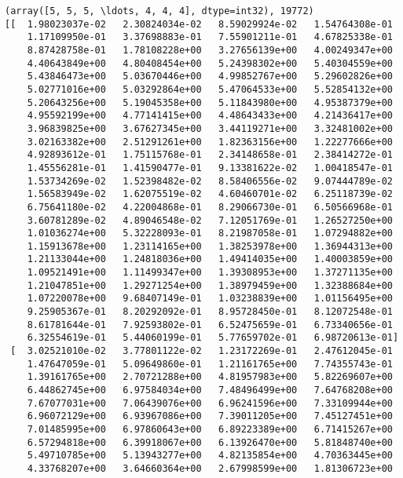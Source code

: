 \documentclass{article}
\begin{document}
    \begin{Verbatim}[commandchars=\\\{\}]
(array([5, 5, 5, \ldots, 4, 4, 4], dtype=int32), 19772)
[[  1.98023037e-02   2.30824034e-02   8.59029924e-02   1.54764308e-01
    1.17109950e-01   3.37698883e-01   7.55901211e-01   4.67825338e-01
    8.87428758e-01   1.78108228e+00   3.27656139e+00   4.00249347e+00
    4.40643849e+00   4.80408454e+00   5.24398302e+00   5.40304559e+00
    5.43846473e+00   5.03670446e+00   4.99852767e+00   5.29602826e+00
    5.02771016e+00   5.03292864e+00   5.47064533e+00   5.52854132e+00
    5.20643256e+00   5.19045358e+00   5.11843980e+00   4.95387379e+00
    4.95592199e+00   4.77141415e+00   4.48643433e+00   4.21436417e+00
    3.96839825e+00   3.67627345e+00   3.44119271e+00   3.32481002e+00
    3.02163382e+00   2.51291261e+00   1.82363156e+00   1.22277666e+00
    4.92893612e-01   1.75115768e-01   2.34148658e-01   2.38414272e-01
    1.45556281e-01   1.41590477e-01   9.13381622e-02   1.00418547e-01
    1.53734269e-02   1.52398482e-02   8.58406556e-02   9.07444789e-02
    1.56583949e-02   1.62075519e-02   4.60460701e-02   6.25118739e-02
    6.75641180e-02   4.22004868e-01   8.29066730e-01   6.50566968e-01
    3.60781289e-02   4.89046548e-02   7.12051769e-01   1.26527250e+00
    1.01036274e+00   5.32228093e-01   8.21987058e-01   1.07294882e+00
    1.15913678e+00   1.23114165e+00   1.38253978e+00   1.36944313e+00
    1.21133044e+00   1.24818036e+00   1.49414035e+00   1.40003859e+00
    1.09521491e+00   1.11499347e+00   1.39308953e+00   1.37271135e+00
    1.21047851e+00   1.29271254e+00   1.38979459e+00   1.32388684e+00
    1.07220078e+00   9.68407149e-01   1.03238839e+00   1.01156495e+00
    9.25905367e-01   8.20292092e-01   8.95728450e-01   8.12072548e-01
    8.61781644e-01   7.92593802e-01   6.52475659e-01   6.73340656e-01
    6.32554619e-01   5.44060199e-01   5.77659702e-01   6.98720613e-01]
 [  3.02521010e-02   3.77801122e-02   1.23172269e-01   2.47612045e-01
    1.47647059e-01   5.09649860e-01   1.21161765e+00   7.74355743e-01
    1.39161765e+00   2.70721288e+00   4.81957983e+00   5.82269607e+00
    6.44862745e+00   6.97584034e+00   7.48496499e+00   7.64768208e+00
    7.67077031e+00   7.06439076e+00   6.96241596e+00   7.33109944e+00
    6.96072129e+00   6.93967086e+00   7.39011205e+00   7.45127451e+00
    7.01485995e+00   6.97860643e+00   6.89223389e+00   6.71415267e+00
    6.57294818e+00   6.39918067e+00   6.13926470e+00   5.81848740e+00
    5.49710785e+00   5.13943277e+00   4.82135854e+00   4.70363445e+00
    4.33768207e+00   3.64660364e+00   2.67998599e+00   1.81306723e+00

\end{Verbatim}
\end{document}
